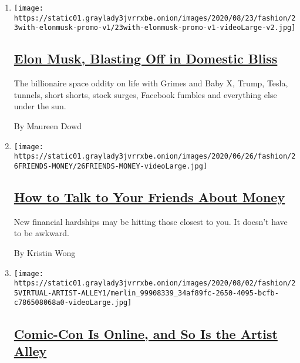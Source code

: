 \begin{enumerate}
\def\labelenumi{\arabic{enumi}.}
\item
  \texttt{[image: https://static01.graylady3jvrrxbe.onion/images/2020/08/23/fashion/23with-elonmusk-promo-v1/23with-elonmusk-promo-v1-videoLarge-v2.jpg]}

  \hypertarget{elon-musk-blasting-off-in-domestic-bliss}{%
  \subsection{\texorpdfstring{\href{/2020/07/25/style/elon-musk-maureen-dowd.html}{Elon
  Musk, Blasting Off in Domestic
  Bliss}}{Elon Musk, Blasting Off in Domestic Bliss}}\label{elon-musk-blasting-off-in-domestic-bliss}}

  The billionaire space oddity on life with Grimes and Baby X, Trump,
  Tesla, tunnels, short shorts, stock surges, Facebook fumbles and
  everything else under the sun.

  By Maureen Dowd
\item
  \texttt{[image: https://static01.graylady3jvrrxbe.onion/images/2020/06/26/fashion/26FRIENDS-MONEY/26FRIENDS-MONEY-videoLarge.jpg]}

  \hypertarget{how-to-talk-to-your-friends-about-money}{%
  \subsection{\texorpdfstring{\href{/2020/07/25/style/how-to-talk-to-friends-about-money.html}{How
  to Talk to Your Friends About
  Money}}{How to Talk to Your Friends About Money}}\label{how-to-talk-to-your-friends-about-money}}

  New financial hardships may be hitting those closest to you. It
  doesn't have to be awkward.

  By Kristin Wong
\item
  \texttt{[image: https://static01.graylady3jvrrxbe.onion/images/2020/08/02/fashion/25VIRTUAL-ARTIST-ALLEY1/merlin\_99908339\_34af89fc-2650-4095-bcfb-c786508068a0-videoLarge.jpg]}

  \hypertarget{comic-con-is-online-and-so-is-the-artist-alley}{%
  \subsection{\texorpdfstring{\href{/2020/07/25/style/comic-con-online-artist-alley.html}{Comic-Con
  Is Online, and So Is the Artist
  Alley}}{Comic-Con Is Online, and So Is the Artist Alley}}\label{comic-con-is-online-and-so-is-the-artist-alley}}


\end{enumerate}

